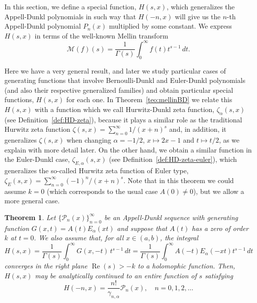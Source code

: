 \documentclass[a4paper]{amsart}
\newcommand{\Ea}{E_{\alpha}}
\newcommand{\calP}{\mathcal{P}}
\renewcommand{\Re}{\operatorname{Re}}
\theoremstyle{plain}
\newtheorem{theorem}{Theorem}[section]
\theoremstyle{definition}
\theoremstyle{remark}
\numberwithin{equation}{section}
\begin{document}
In this section, we define a special function, $H(s,x)$, which generalizes the Appell-Dunkl polynomials in such way that $H(-n,x)$ will give us the $n$-th Appell-Dunkl polynomial $P_n(x)$ multiplied by some constant. We express $H(s,x)$ in terms of the well-known Mellin transform
\[
\mathcal{M}(f)(s) =  \frac{1}{\Gamma(s)} \int_{0}^{\infty} f(t)t^{s-1} \,dt.
\]

Here we have a very general result, and later we study particular cases of generating functions that involve Bernoulli-Dunkl and Euler-Dunkl polynomials (and also their respective generalized families) and obtain particular special functions, $H(s,x)$ for each one. In Theorem~\ref{teo:mellinBD} we relate this $H(s,x)$ with a function which we call Hurwitz-Dunkl zeta function, $\zeta_{\alpha}(s,x)$ (see Definition~\ref{def:HD-zeta}), because it plays a similar role as the traditional Hurwitz zeta function $\zeta(s,x) = \sum_{n=0}^{\infty}1/(x+n)^s$ and, in addition, it generalizes $\zeta(s,x)$ when changing $\alpha=-1/2$, $x\mapsto 2x-1$ and $t\mapsto t/2$, as we explain with more detail later. On the other hand, we obtain a similar function in the Euler-Dunkl case, $\zeta_{E,\alpha}(s,x)$ (see Definition~\ref{def:HD-zeta-euler}), which generalizes the so-called Hurwitz zeta function of Euler type, $\zeta_E(s,x) = \sum_{n=0}^{\infty}(-1)^n/(x+n)^s$. 
Note that in this theorem we could assume $k=0$ (which corresponds to the usual case $A(0) \ne 0$), but we allow a more general case.

\begin{theorem}
\label{teo:MellinAD}
Let $\{\calP_{n}(x)\}_{n=0}^{\infty}$ be an Appell-Dunkl sequence with generating function $G(x,t) = A(t) \Ea(xt)$ and suppose that $A(t)$ has a zero of order $k$ at $t=0$. 
We also assume that, for all $x \in (a,b)$, the integral
\begin{equation}
\label{eq:MellinAD}
    H(s,x) = \frac{1}{\Gamma(s)}\int_{0}^{\infty} G(x,-t)\,t^{s-1}\,dt 
         = \frac{1}{\Gamma(s)} \int_{0}^{\infty} A(-t) \Ea(-xt) t^{s-1}\,dt
\end{equation}
converges in the right plane $\Re(s) > -k$ to a holomophic function.
Then, $H(s,x)$ may be analytically continued to an entire function of $s$ satisfying
\begin{equation*}
  H(-n,x) = \frac{n!}{\gamma_{n,\alpha}}\calP_{n}(x),\quad n=0,1,2,\dots
\end{equation*}
\end{theorem}
\end{document}

